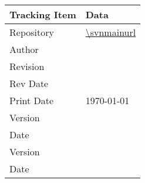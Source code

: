
\begin{table}[htbp]
	\centering
		\begin{tabular}{|p{2.0in}|p{4.4in}|}
		\hline
			{\bfseries Tracking Item}  &  {\bfseries Data} \\
		\hline		
		\hline
			Repository         & \url{\svnmainurl}  \\
		\hline
			Author         & \svnauthor  \\			
		\hline
			Revision       & \svnrev     \\	
		\hline
			Rev Date       & \svndate    \\	
		\hline	
			Print Date     & \today{} \currenttime    \\	
		\hline
			\DocumentClsName\break Version     & \DocumentClsVersion    \\	
		\hline	
			\DocumentClsName\break Date        & \DocumentClsDate   \\	
		\hline
			\DocumentTexName\break Version     & \DocumentTexVersion    \\	
		\hline	
			\DocumentTexName\break Date        & \DocumentTexDate   \\	
		\hline						
    \end{tabular}
\end{table}